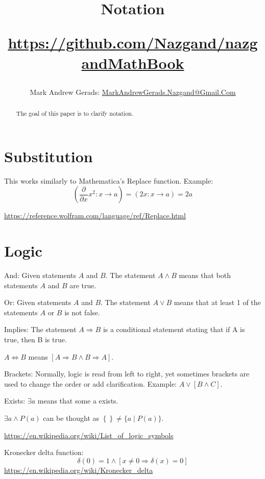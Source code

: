\documentclass[]{article}
\author{Mark Andrew Gerads: \href{MailTo:MarkAndrewGerads.Nazgand@Gmail.Com}{MarkAndrewGerads.Nazgand@Gmail.Com}}
\title{
	Notation
	
	\href{https://github.com/Nazgand/nazgandMathBook}{https://github.com/Nazgand/nazgandMathBook}
}
\newcommand{\pqty}[1]{{\left(#1\right)}}
\newcommand{\Bqty}[1]{{\left\{#1\right\}}}
\newcommand{\bqty}[1]{{\left[#1\right]}}
\newcommand{\pdiff}[2]{\frac{\partial^{#2}}{\partial #1^{#2}}}
\numberwithin{equation}{section}
\begin{document}
	
	\maketitle
	
	\begin{abstract}
		The goal of this paper is to clarify notation.
	\end{abstract}
	
	\section{Substitution}
	This works similarly to Mathematica's Replace function. Example:
	\begin{equation}
	\pqty{\pdiff{x}{}x^2:x\to a}=
	\pqty{2x:x\to a}=2a
	\end{equation}
	
	\url{https://reference.wolfram.com/language/ref/Replace.html}
	
	\section{Logic}
	
	And: Given statements \(A\) and \(B\). The statement \(A\land B\) means that both statements \(A\) and \(B\) are true.
	
	Or: Given statements \(A\) and \(B\). The statement \(A\lor B\) means that at least 1 of the statements \(A\) or \(B\) is not false.
	
	Implies: The statement \(A\Rightarrow B\) is a conditional statement stating that if A is true, then B is true. 
	
	\(A\Leftrightarrow B\) means \(\bqty{A\Rightarrow B\land B\Rightarrow A}\).
	
	Brackets: Normally, logic is read from left to right, yet sometimes brackets are used to change the order or add clarification. Example: \(A\lor\bqty{B\land C}\).
	
	Exists: \(\exists a\) means that some a exists.
	
	\(\exists a\land P\pqty{a}\) can be thought as \(\Bqty{}\neq\{a\mid P\pqty{a}\}\).
	
	\url{https://en.wikipedia.org/wiki/List_of_logic_symbols}
	
	Kronecker delta function:
	\begin{equation}
	\delta\pqty{0}=1
	\land
	\bqty{x\neq 0 \Rightarrow \delta\pqty{x}=0}
	\end{equation}
	\url{https://en.wikipedia.org/wiki/Kronecker_delta}
	
\end{document}
